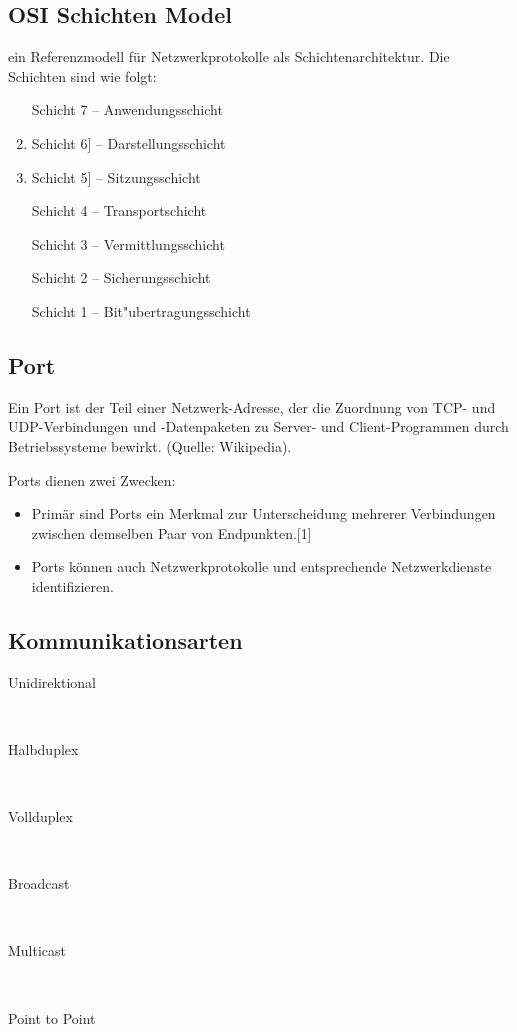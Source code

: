 \subsection{OSI Schichten Model}
ein Referenzmodell für Netzwerkprotokolle als Schichtenarchitektur. Die Schichten sind wie folgt:

\begin{enumerate}
\item[Schicht 7] – Anwendungsschicht
\item Schicht 6] – Darstellungsschicht
\item Schicht 5] – Sitzungsschicht
\item[Schicht 4] – Transportschicht
\item[Schicht 3] – Vermittlungsschicht
\item[Schicht 2] – Sicherungsschicht
\item[Schicht 1] – Bit"ubertragungsschicht

\end{enumerate}

\subsection{Port}
Ein Port ist der Teil einer Netzwerk-Adresse, der die Zuordnung von TCP- und UDP-Verbindungen und -Datenpaketen zu Server- und Client-Programmen durch Betriebssysteme bewirkt. (Quelle: Wikipedia).

Ports dienen zwei Zwecken:
\begin{itemize}
\item Primär sind Ports ein Merkmal zur Unterscheidung mehrerer Verbindungen zwischen demselben Paar von Endpunkten.[1]
\item Ports können auch Netzwerkprotokolle und entsprechende Netzwerkdienste identifizieren.
\end{itemize}

\subsection{Kommunikationsarten}

\begin{description}
\item[Unidirektional] \hfill \\
\item[Halbduplex] \hfill \\
\item[Vollduplex] \hfill \\
\item[Broadcast] \hfill \\
\item[Multicast] \hfill \\
\item[Point to Point] \hfill \\
\end{description}

